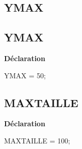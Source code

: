\documentclass{report}
\newif\ifpdf
\begin{document}
\subsection*{\large{\textbf{YMAX}}\normalsize\hspace{1ex}\hrulefill}
\else
\subsection*{YMAX}
\fi
\label{Types-YMAX}
\begin{list}{}{
\setlength{\itemindent}{0cm}
\setlength{\listparindent}{0cm}
\setlength{\leftmargin}{\evensidemargin}
\addtolength{\leftmargin}{\tmplength}
\settowidth{\labelsep}{X}
\addtolength{\leftmargin}{\labelsep}
\setlength{\labelwidth}{\tmplength}
}
\item[\textbf{Déclaration}\hfill]
\ifpdf
\begin{flushleft}
\fi
\begin{ttfamily}
YMAX = 50;\end{ttfamily}

\ifpdf
\end{flushleft}
\fi

\end{list}
\ifpdf
\subsection*{\large{\textbf{MAXTAILLE}}\normalsize\hspace{1ex}\hrulefill}
\else
\subsection*{MAXTAILLE}
\fi
\label{Types-MAXTAILLE}
\begin{list}{}{
\setlength{\itemindent}{0cm}
\setlength{\listparindent}{0cm}
\setlength{\leftmargin}{\evensidemargin}
\addtolength{\leftmargin}{\tmplength}
\settowidth{\labelsep}{X}
\addtolength{\leftmargin}{\labelsep}
\setlength{\labelwidth}{\tmplength}
}
\item[\textbf{Déclaration}\hfill]
\ifpdf
\begin{flushleft}
\fi
\begin{ttfamily}
MAXTAILLE = 100;\end{ttfamily}

\ifpdf
\end{flushleft}
\fi

\end{list}
\ifpdf
\end{document}
